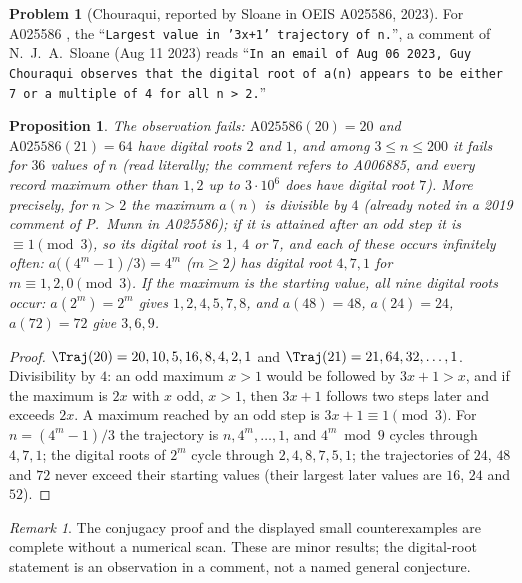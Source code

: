 \documentclass[11pt,a4paper]{article}
\newtheorem{proposition}[theorem]{Proposition}
\theoremstyle{definition}
\newtheorem{problem}[theorem]{Problem}
\theoremstyle{remark}
\newtheorem{remark}[theorem]{Remark}
\numberwithin{equation}{section}
\begin{document}
\begin{problem}[Chouraqui, reported by Sloane in OEIS A025586, 2023]\label{B:P:prob:A025586}
For A025586 \cite{R054}, the ``\texttt{Largest value in '3x+1' trajectory of
n.}'', a comment of N.~J.~A.~Sloane (Aug 11 2023) reads ``\texttt{In an email of
Aug 06 2023, Guy Chouraqui observes that the digital root of a(n) appears to be
either 7 or a multiple of 4 for all n > 2.}''
\end{problem}

\begin{proposition}\label{B:P:prop:A025586}
The observation fails: $\mathrm{A025586}(20)=20$ and $\mathrm{A025586}(21)=64$ have
digital roots $2$ and $1$, and among $3\le n\le200$ it fails for $36$ values of
$n$ (read literally; the comment refers to A006885, and every record maximum other than
$1,2$ up to $3\cdot10^6$ does have digital root $7$). More precisely, for $n>2$ the maximum
$a(n)$ is divisible by $4$ (already noted in a 2019 comment of P.~Munn in A025586); if it is
attained after an odd step it is $\equiv1\pmod3$, so its digital root is $1$,
$4$ or $7$, and each of these occurs infinitely often:
$a\bigl((4^m-1)/3\bigr)=4^m$ ($m\ge2$) has digital root $4,7,1$ for $m\equiv1,2,0\pmod3$.
If the maximum is the starting value, all nine digital roots occur: $a(2^m)=2^m$
gives $1,2,4,5,7,8$, and $a(48)=48$, $a(24)=24$, $a(72)=72$ give $3,6,9$.
\end{proposition}

\begin{proof}
$\Traj(20)=20,10,5,16,8,4,2,1$ and $\Traj(21)=21,64,32,\dots,1$. Divisibility by
$4$: an odd maximum $x>1$ would be followed by $3x+1>x$, and if the maximum is
$2x$ with $x$ odd, $x>1$, then $3x+1$ follows two steps later and exceeds $2x$.
A maximum reached by an odd step is $3x+1\equiv1\pmod3$. For $n=(4^m-1)/3$ the
trajectory is $n,4^m,\dots,1$, and $4^m\bmod9$ cycles through $4,7,1$; the digital
roots of $2^m$ cycle through $2,4,8,7,5,1$; the trajectories of $24$, $48$ and
$72$ never exceed their starting values (their largest later values are $16$,
$24$ and $52$).
\end{proof}

\begin{remark}
The conjugacy proof and the displayed small counterexamples are complete
without a numerical scan. These are minor results; the digital-root statement
is an observation in a comment, not a named general conjecture.
\end{remark}


\end{document}
